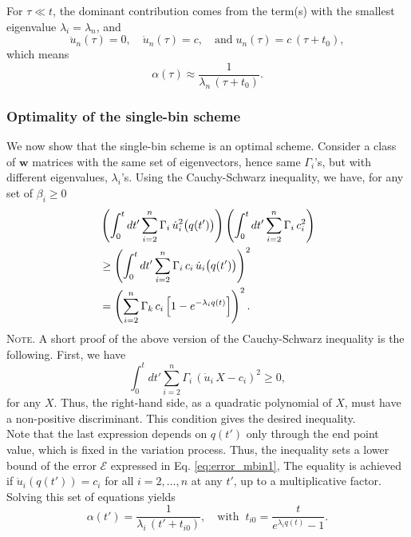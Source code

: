 \documentclass[reprint]{revtex4-1}
\newcommand{\note}[1]{{\color{DarkGreen}\footnotesize \textsc{Note.} #1}}
\begin{document}
%
%
For $\tau \ll t$,
the dominant contribution comes from
the term(s) with the smallest eigenvalue $\lambda_i = \lambda_n$,
and
$$
\ddot u_n(\tau) = 0,
\quad
\dot u_n(\tau) = c,
\quad
\mathrm{and}\;
u_n(\tau) = c \, (\tau + t_0),
$$
which means
$$
\alpha(\tau) \approx \frac{1}{\lambda_n \, (\tau + t_0)}.
$$



\subsubsection{\label{sec:optWL}
Optimality of the single-bin scheme}



We now show
that the single-bin scheme
is an optimal scheme.
%
Consider a class of $\mathbf w$ matrices
with the same set of eigenvectors,
hence same $\Gamma_i$'s,
but with different eigenvalues, $\lambda_i$'s.
%
Using the Cauchy-Schwarz inequality, we have,
for any set of $\beta_i \ge 0$
%
\begin{align}
&
\left( \int_0^t
  dt' \sum_{i = 2}^n \Gamma_i \,
                     \dot u_i^2\bigl( q(t') \bigr)
\right)
\left(
\int_0^t
  dt' \sum_{i = 2}^n \Gamma_i \, c_i^2
\right)
\notag
\\
&
\ge
\left(
\int_0^t
  dt' \sum_{i = 2}^n \Gamma_i \, c_i \,
                     \dot u_i\bigl( q(t') \bigr)
\right)^2
\notag
\\
&
=
\left(
  \sum_{i = 2}^n \Gamma_k \, c_i
    \left[
      1 - e^{ -\lambda_i q(t) }
    \right]
\right)^2.
\notag
\end{align}
%
\note{A short proof of the above version
  of the Cauchy-Schwarz inequality
  is the following.
  First, we have
$$
\int_0^t
  dt' \sum_{i = 2}^n \Gamma_i \,
    \left( \dot u_i \, X - c_i \right)^2
\ge 0,
$$
  for any $X$.
  Thus, the right-hand side,
  as a quadratic polynomial of $X$,
  must have a non-positive discriminant.
  This condition gives the desired inequality.
  \\%
}
%
Note that the last expression depends on
$q(t')$ only through the end point value,
which is fixed in the variation process.
%
Thus, the inequality sets a lower bound
of the error $\mathcal E$
expressed in Eq. \eqref{eq:error_mbin1},
%
The equality is achieved
if $\dot u_i\left( q(t') \right) = c_i$
for all $i = 2, \dots, n$ at any $t'$,
up to a multiplicative factor.
%
Solving this set of equations yields
$$
\alpha(t') = \frac{              1              }
                  { \lambda_i \, (t' + t_{i0} ) },
\quad
\mathrm{with\;\;}
t_{i0} = \frac{             t            }
              { e^{ \lambda_i q(t) } - 1 }.
$$
\end{document}
